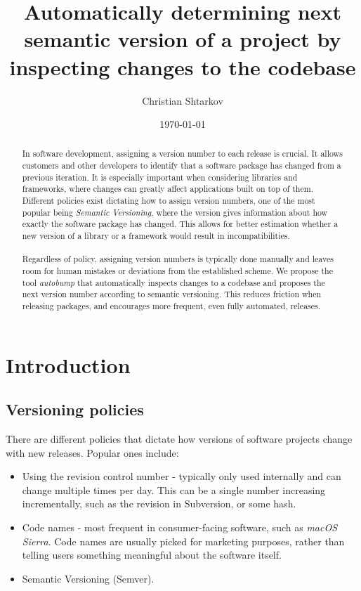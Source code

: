 \documentclass{l4proj}
\begin{document}
\title{Automatically determining next semantic version of a project by \\
  inspecting changes to the codebase}
\author{Christian Shtarkov}
\date{\today}
\maketitle

\begin{abstract} In software development, assigning a version number
to each release is crucial. It allows customers and other developers
to identify that a software package has changed from a previous
iteration. It is especially important when considering libraries and
frameworks, where changes can greatly affect applications built on top
of them. \\ Different policies exist dictating how to assign version
numbers, one of the most popular being \textit{Semantic
Versioning}\cite{SemanticVersioning}, where the version gives
information about how exactly the software package has changed. This
allows for better estimation whether a new version of a library or a
framework would result in incompatibilities.
\\\\
Regardless of
policy, assigning version numbers is typically done manually and
leaves room for human mistakes or deviations from the established
scheme. We propose the tool \textit{autobump} that automatically
inspects changes to a codebase and proposes the next version number
according to semantic versioning. This reduces friction when releasing
packages, and encourages more frequent, even fully automated,
releases.
\end{abstract}

\educationalconsent

\tableofcontents

\chapter{Introduction}

\section{Versioning policies}

There are different policies that dictate how versions of software
projects change with new releases. Popular ones include:

\begin{itemize}
\item Using the revision control number - typically only used
internally and can change multiple times per day. This can be a single
number increasing incrementally, such as the revision in Subversion,
or some hash.
\item Code names - most frequent in consumer-facing software, such as
\textit{macOS Sierra}. Code names are usually picked for marketing
purposes, rather than telling users something meaningful about the
software itself.
\item Semantic Versioning (Semver)\cite{SemanticVersioning}.
\end{itemize}
\end{document}
